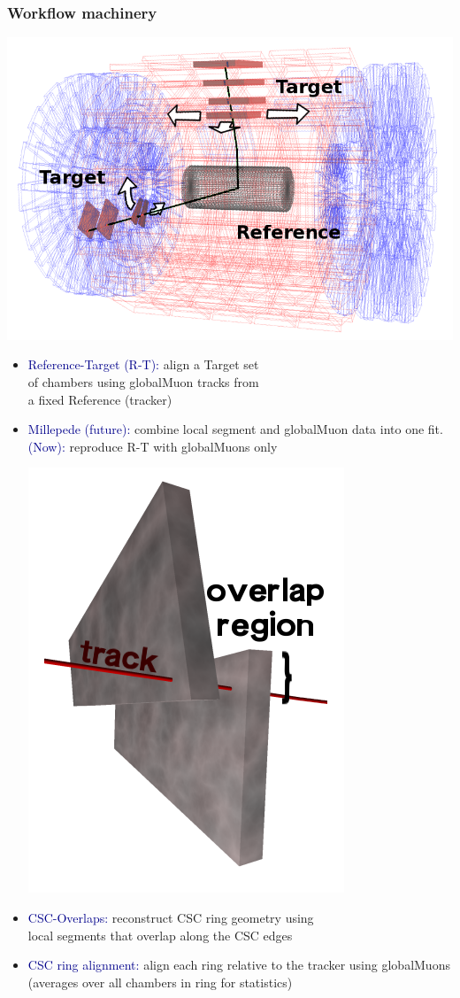 \documentclass[compress]{beamer}
\begin{document}
\begin{frame}
\frametitle{Workflow machinery}
\hfill \includegraphics[width=3.5 cm]{reference-target.png}

\vspace{-2.3 cm}
\begin{itemize}\setlength{\itemsep}{0.75 cm}
\item \textcolor{darkblue}{Reference-Target (R-T):} align a Target set \\ of chambers using globalMuon tracks
  from \\ a fixed Reference (tracker)

\item \textcolor{darkblue}{Millepede (future):} combine local segment
  and globalMuon data into one fit.  \textcolor{darkblue}{(Now):} reproduce R-T with globalMuons only

\vspace{-0.1 cm}
\hfill \includegraphics[width=1.5 cm]{overlaps.png}

\vspace{-2.1 cm}
\item \textcolor{darkblue}{CSC-Overlaps:} reconstruct CSC ring
  geometry using \\ local segments that overlap along the CSC edges

\item \textcolor{darkblue}{CSC ring alignment:} align each ring relative
  to the tracker using globalMuons (averages over all chambers in
  ring for statistics)
\end{itemize}
\end{frame}
\end{document}
